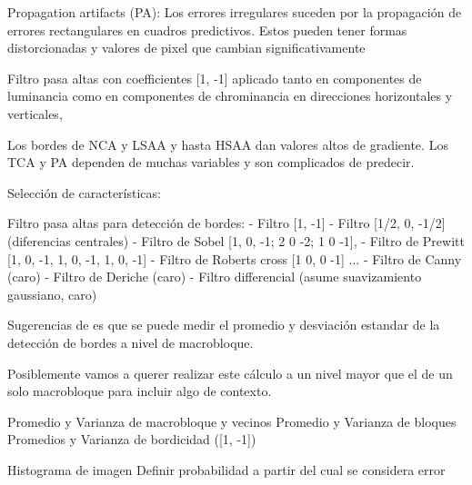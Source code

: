 Propagation artifacts (PA): Los errores irregulares suceden por la propagación de errores rectangulares en cuadros predictivos. Estos pueden tener formas distorcionadas y valores de pixel que cambian significativamente

Filtro pasa altas con coefficientes [1, -1] aplicado tanto en componentes de luminancia como en componentes de chrominancia en direcciones horizontales y verticales,

Los bordes de NCA y LSAA y hasta HSAA dan valores altos de gradiente.
Los TCA y PA dependen de muchas variables y son complicados de predecir.

Selección de características:

Filtro pasa altas para detección de bordes:
- Filtro [1, -1]
- Filtro [1/2, 0, -1/2] (diferencias centrales)
- Filtro de Sobel [1, 0, -1; 2 0 -2; 1 0 -1], \cite{Korhonen2018}
- Filtro de Prewitt [1, 0, -1, 1, 0, -1, 1, 0, -1]
- Filtro de Roberts cross [1 0, 0 -1]
...
- Filtro de Canny (caro)
- Filtro de Deriche (caro)
- Filtro differencial (asume suavizamiento gaussiano, caro)

Sugerencias de \cite{Glavota2016, Korhonen2018} es que se puede medir el promedio y desviación estandar de la detección de bordes a nivel de macrobloque.

Posiblemente vamos a querer realizar este cálculo a un nivel mayor que el de un solo macrobloque para incluir algo de contexto.

Promedio y Varianza de macrobloque y vecinos
Promedio y Varianza de bloques
Promedios y Varianza de bordicidad ([1, -1])

Histograma de imagen
Definir probabilidad a partir del cual se considera error


